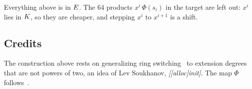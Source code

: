 Everything above is in $E$. The $64$ products $x^i\,\Phi(s_i)$ in the target are left out: $x^i$ lies in $K$, so they are cheaper, and stepping $x^i$ to $x^{i+1}$ is a shift.

\subsection{Credits}\label{rs:credits}

The construction above rests on generalizing ring switching~\cite{DP24} to extension degrees that are not powers of two, an idea of Lev Soukhanov, \textit{[[alloc]init]}. The map $\Phi$ follows~\cite{Flock26}.
